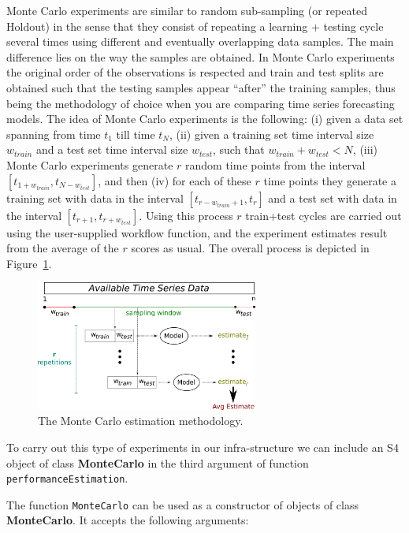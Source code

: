 \documentclass[10pt,a4paper]{article}\usepackage[]{graphicx}\usepackage[]{color}
\begin{document}
Monte Carlo experiments are similar to random sub-sampling (or repeated
Holdout) in the sense that they consist of repeating a learning +
testing cycle several times using different and eventually overlapping data samples. The main
difference lies on the way the samples are obtained. In Monte Carlo
experiments the original order of the observations is respected and
train and test splits are obtained such that the testing samples
appear ``after'' the training samples, thus being the methodology of
choice when you are comparing time series forecasting models. The idea
of Monte Carlo experiments is the following: (i) given a data set
spanning from time $t_1$ till time $t_N$, (ii) given a training set
time interval size $w_{train}$ and a test set time interval size $w_{test}$, such
that $w_{train}+w_{test} < N$, (iii) Monte Carlo experiments generate $r$ random time
points from the interval $[t_{1+w_{train}},t_{N-w_{test}}]$, and then (iv) for each
of these $r$ time points they generate a training set with data in the
interval $[t_{r-w_{train}+1},t_{r}]$ and a test set with data in the interval
$[t_{r+1},t_{r+w_{test}}]$. Using this process $r$ train+test cycles are
carried out using the user-supplied workflow function, and the
experiment estimates result from the average of the $r$ scores as
usual. The overall process is depicted in Figure~\ref{fig:MC}.

\begin{figure}[ht]
  \centering
  \includegraphics[width=0.65\textwidth]{figures/MCestimates.png}
  \caption{The Monte Carlo estimation methodology.}
  \label{fig:MC}
\end{figure}

To carry out this type of experiments in our infra-structure we can
include an S4 object of class \textbf{MonteCarlo} in the third
argument of function \texttt{performanceEstimation}.

The function \texttt{MonteCarlo} can be used as a constructor of
objects of class \textbf{MonteCarlo}. It accepts the following
arguments:
\end{document}
